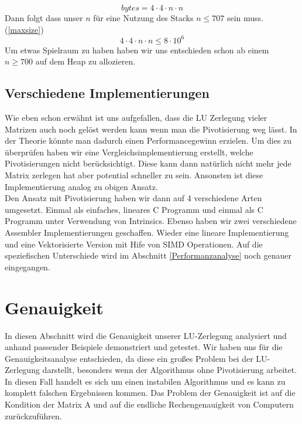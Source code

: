 \documentclass[course=erap]{aspdoc}
\begin{document}
 \begin{equation}
 \label{size}
  bytes = 4 \cdot 4 \cdot n \cdot n
 \end{equation}
Dann folgt dass unser $n$ für eine Nutzung des Stacks  $n \leq 707$  sein muss.(\ref{maxsize})
 \begin{equation}
 \label{maxsize}
  4 \cdot 4 \cdot n \cdot n \leq 8 \cdot 10^6
 \end{equation}
 Um etwas Spielraum zu haben haben wir uns entschieden schon ab einem $n \geq 700$ auf dem Heap zu allozieren.\\


\subsection{Verschiedene Implementierungen}
Wie eben schon erwähnt ist uns aufgefallen, dass die LU Zerlegung vieler Matrizen auch noch gelöst werden kann wenn man die Pivotisierung weg lässt. In der Theorie könnte man dadurch einen Performancegewinn erzielen. 
Um dies zu überprüfen haben wir eine Vergleichsimplementierung erstellt, welche Pivotisierungen nicht berücksichtigt. Diese kann dann natürlich nicht mehr jede Matrix zerlegen hat aber potential schneller zu sein.
  Ansonsten ist diese Implementierung analog zu obigen Ansatz.\\
  
Den Ansatz mit Pivotisierung haben wir dann auf 4 verschiedene Arten umgesetzt. Einmal als einfaches, lineares C Programm und einmal als C Programm unter Verwendung von Intrinsics.
 Ebenso haben wir zwei verschiedene Assembler Implementierungen geschaffen. Wieder eine lineare Implementierung und eine Vektorisierte Version mit Hife von SIMD Operationen.
 Auf die speziefischen Unterschiede wird im Abschnitt \ref{Performanzanalyse} noch genauer eingegangen.


\section{Genauigkeit}
In diesen Abschnitt wird die Genauigkeit unserer LU-Zerlegung analysiert und anhand
 passender Beispiele demonstriert und getestet. Wir haben uns für die 
Genauigkeitsanalyse entschieden, da diese ein großes Problem bei der LU-Zerlegung
 darstellt, besonders wenn der Algorithmus ohne Pivotisierung arbeitet. In diesen Fall 
handelt es sich um einen instabilen Algorithmus und es kann zu komplett 
falschen Ergebnissen kommen. Das Problem der Genauigkeit ist auf die Kondition der 
Matrix A und auf die endliche Rechengenauigkeit von Computern zurückzuführen.  \\
\end{document}
